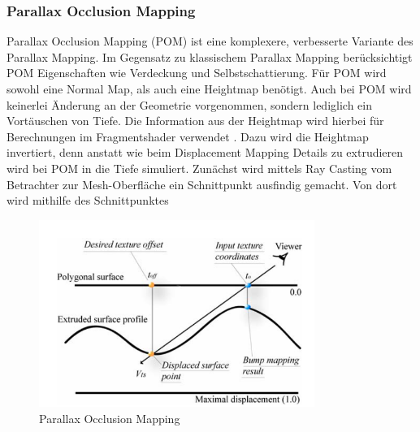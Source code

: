 \subsubsection{Parallax Occlusion Mapping}

Parallax Occlusion Mapping (POM) ist eine komplexere, verbesserte Variante des Parallax Mapping.
Im Gegensatz zu klassischem Parallax Mapping berücksichtigt POM Eigenschaften wie Verdeckung und 
Selbstschattierung. Für POM wird sowohl eine Normal Map, als auch eine Heightmap benötigt. 
Auch bei POM wird keinerlei Änderung an der Geometrie vorgenommen, sondern lediglich
ein Vortäuschen von Tiefe. Die Information aus der Heightmap wird hierbei für Berechnungen 
im Fragmentshader verwendet \parencite{Tatarchuk2006}. Dazu wird die Heightmap invertiert, denn anstatt
wie beim Displacement Mapping Details zu extrudieren wird bei POM in die Tiefe simuliert.  
Zunächst wird mittels Ray Casting vom Betrachter zur Mesh-Oberfläche ein Schnittpunkt ausfindig gemacht. 
Von dort wird mithilfe des Schnittpunktes 

\begin{figure}[h]
    \centering
	\includegraphics[width=0.8\textwidth]{Grafiken/POM.png}
	\begin{footnotesize}
		\caption{Parallax Occlusion Mapping}
	\end{footnotesize}
\end{figure}




